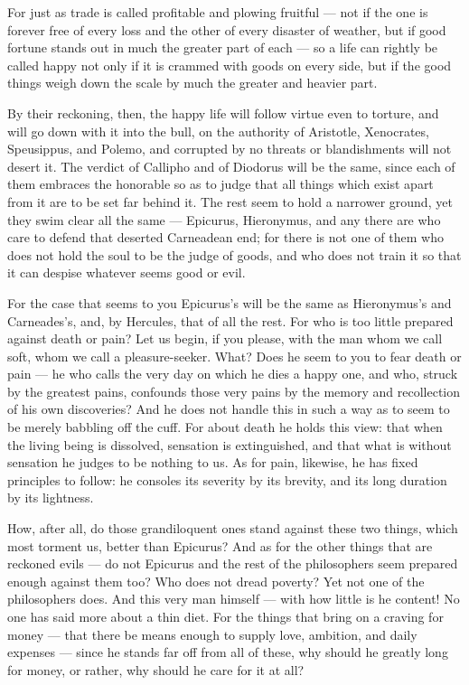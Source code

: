  For just as trade is called profitable and plowing fruitful — not if the one is forever free of every loss and the other of every disaster of weather, but if good fortune stands out in much the greater part of each — so a life can rightly be called happy not only if it is crammed with goods on every side, but if the good things weigh down the scale by much the greater and heavier part.

 By their reckoning, then, the happy life will follow virtue even to torture, and will go down with it into the bull, on the authority of Aristotle, Xenocrates, Speusippus, and Polemo, and corrupted by no threats or blandishments will not desert it. The verdict of Callipho and of Diodorus will be the same, since each of them embraces the honorable so as to judge that all things which exist apart from it are to be set far behind it. The rest seem to hold a narrower ground, yet they swim clear all the same — Epicurus, Hieronymus, and any there are who care to defend that deserted Carneadean end; for there is not one of them who does not hold the soul to be the judge of goods, and who does not train it so that it can despise whatever seems good or evil.

 For the case that seems to you Epicurus's will be the same as Hieronymus's and Carneades's, and, by Hercules, that of all the rest. For who is too little prepared against death or pain? Let us begin, if you please, with the man whom we call soft, whom we call a pleasure-seeker. What? Does he seem to you to fear death or pain — he who calls the very day on which he dies a happy one, and who, struck by the greatest pains, confounds those very pains by the memory and recollection of his own discoveries? And he does not handle this in such a way as to seem to be merely babbling off the cuff. For about death he holds this view: that when the living being is dissolved, sensation is extinguished, and that what is without sensation he judges to be nothing to us. As for pain, likewise, he has fixed principles to follow: he consoles its severity by its brevity, and its long duration by its lightness.

 How, after all, do those grandiloquent ones stand against these two things, which most torment us, better than Epicurus? And as for the other things that are reckoned evils — do not Epicurus and the rest of the philosophers seem prepared enough against them too? Who does not dread poverty? Yet not one of the philosophers does. And this very man himself — with how little is he content! No one has said more about a thin diet. For the things that bring on a craving for money — that there be means enough to supply love, ambition, and daily expenses — since he stands far off from all of these, why should he greatly long for money, or rather, why should he care for it at all?

